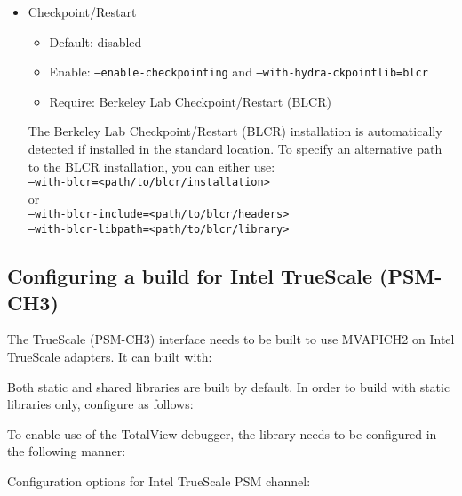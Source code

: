 \begin{itemize}
  \item Checkpoint/Restart
    \begin{itemize}
      \item Default: disabled
      \item Enable: \texttt{--enable-checkpointing} and \texttt{--with-hydra-ckpointlib=blcr}
      \item Require: Berkeley Lab Checkpoint/Restart (BLCR)
    \end{itemize}

    The Berkeley Lab Checkpoint/Restart (BLCR) installation is automatically detected if installed
in the standard location. To specify an alternative path to the BLCR installation, you can either use:\\
    \texttt{--with-blcr=<path/to/blcr/installation> } \\
    or \\
    \texttt{--with-blcr-include=<path/to/blcr/headers> \\ --with-blcr-libpath=<path/to/blcr/library>}

\end{itemize}


\subsection{Configuring a build for Intel TrueScale (PSM-CH3)}
\label{subsec:config-psm}

The TrueScale (PSM-CH3) interface needs to be built to use MVAPICH2 on Intel
TrueScale adapters. It can built with:


Both static and shared libraries are built by default. In order to build with static libraries only, configure as follows:


To enable use of the TotalView debugger, the library needs to be configured
in the following manner:


Configuration options for Intel TrueScale PSM channel:

